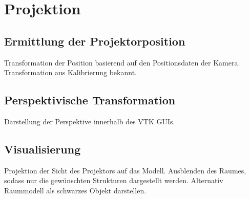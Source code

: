 \chapter{Projektion}

\section{Ermittlung der Projektorposition}
Transformation der Position basierend auf den Positionsdaten der Kamera. Transformation aus Kalibrierung bekannt.\\

\section{Perspektivische Transformation}
Darstellung der Perspektive innerhalb des VTK GUIs.

\section{Visualisierung}
Projektion der Sicht des Projektors auf das Modell. Ausblenden des Raumes, sodass nur die gewünschten Strukturen dargestellt werden. Alternativ Raummodell als schwarzes Objekt darstellen.